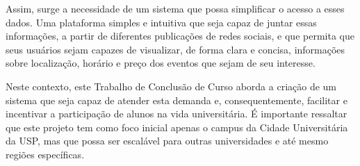 Assim, surge a necessidade de um sistema que possa simplificar o acesso a esses
dados. Uma plataforma simples e intuitiva que seja capaz de juntar essas
informações, a partir de diferentes publicações de redes sociais, e que permita
que seus usuários sejam capazes de visualizar, de forma clara e concisa,
informações sobre localização, horário e preço dos eventos que sejam de seu
interesse.

Neste contexto, este Trabalho de Conclusão de Curso aborda a criação de um
sistema que seja capaz de atender esta demanda e, consequentemente, facilitar e
incentivar a participação de alunos na vida universitária. É importante
ressaltar que este projeto tem como foco inicial apenas o campus da
Cidade Universitária da USP, mas que possa ser escalável para outras
universidades e até mesmo regiões específicas.